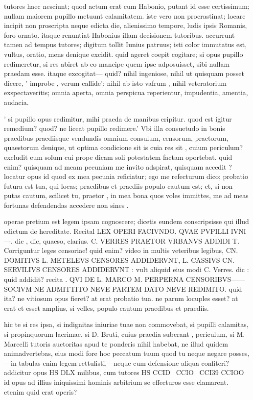  tutores haec nesciunt; quod actum erat cum Habonio, putant id esse certissimum; nullam maiorem pupillo metuunt calamitatem. iste vero non procrastinat; locare incipit non proscripta neque edicta die, alienissimo tempore, ludis ipsis Romanis, foro ornato. itaque renuntiat Habonius illam decisionem tutoribus. accurrunt tamen ad tempus tutores; digitum tollit Iunius patruus; isti color immutatus est, vultus, oratio, mens denique excidit. quid ageret coepit cogitare; si opus pupillo redimeretur, si res abiret ab eo mancipe quem ipse adposuisset, sibi nullam praedam esse. itaque excogitat— quid? nihil ingeniose, nihil ut quisquam posset dicere, ' improbe , verum callide'; nihil ab isto vafrum , nihil veteratorium exspectaveritis; omnia aperta, omnia perspicua reperientur, impudentia, amentia, audacia.

 ' si pupillo opus redimitur, mihi praeda de manibus eripitur. quod est igitur remedium? quod? ne liceat pupillo redimere.' Vbi illa consuetudo in bonis praedibus praediisque vendundis omnium consulum, censorum, praetorum, quaestorum denique, ut optima condicione sit is cuia res sit , cuium periculum? excludit eum solum cui prope dicam soli potestatem factam oportebat. quid enim? quisquam ad meam pecuniam me invito adspirat, quisquam accedit ? locatur opus id quod ex mea pecunia reficiatur; ego me refecturum dico; probatio futura est tua, qui locas; praedibus et praediis populo cautum est; et, si non putas cautum, scilicet tu, praetor , in mea bona quos voles immittes, me ad meas fortunas defendendas accedere non sines .

 operae pretium est legem ipsam cognoscere; dicetis eundem conscripsisse qui illud edictum de hereditate. Recital LEX OPERI FACIVNDO. QVAE PVPILLI IVNI —. dic , dic, quaeso, clarius. C. VERRES PRAETOR VRBANVS ADDIDI T. Corriguntur leges censoriae! quid enim? video in multis veteribus legibus, CN. DOMITIVS L. METELEVS CENSORES ADDIDERVNT, L. CASSIVS CN. SERVILIVS CENSORES ADDIDERVNT : vult aliquid eius modi C. Verres. dic : quid addidit? recita . QVI DE L. MARCO M. PERPERNA CENSORIBVS—— SOCIVM NE ADMITTITO NEVE PARTEM DATO NEVE REDIMITO. quid ita? ne vitiosum opus fieret? at erat probatio tua. ne parum locuples esset? at erat et esset amplius, si velles, populo cautum praedibus et praediis.

 hic te si res ipsa, si indignitas iniuriae tuae non commovebat, si pupilli calamitas, si propinquorum lacrimae, si D. Bruti, cuius praedia suberant , periculum, si M. Marcelli tutoris auctoritas apud te ponderis nihil habebat, ne illud quidem animadvertebas, eius modi fore hoc peccatum tuum quod tu neque negare posses, —in tabulas enim legem rettulisti,—neque cum defensione aliqua confiteri? addicitur opus HS DLX milibus, cum tutores HS CCID~ CCIO~ CCI39 CCIOO id opus ad illius iniquissimi hominis arbitrium se effecturos esse clamarent. etenim quid erat operis?

